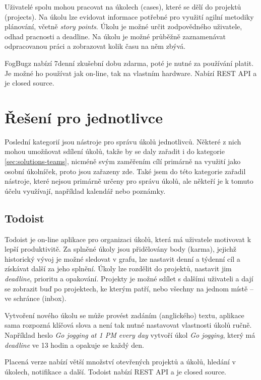 \documentclass[thesis=B,czech]{FITthesis}[2012/06/26]
\begin{document}
			Uživatelé spolu mohou pracovat na úkolech (cases), které se dělí do projektů (projects). Na úkolu lze evidovat informace potřebné pro využití agilní metodiky plánování, včetně \textit{story points}. Úkolu je možné určit zodpovědného uživatele, odhad pracnosti a deadline. Na úkolu je možné průběžně zaznamenávat odpracovanou práci a zobrazovat kolik času na něm zbývá.
			
			FogBugz nabízí 7denní zkušební dobu zdarma, poté je nutné za používání platit. Je možné ho používat jak on-line, tak na vlastním hardware. Nabízí REST API a je closed source.

	\section{Řešení pro jednotlivce}
		\label{sec:solutions-individuals}
		Poslední kategorií jsou nástroje pro správu úkolů jednotlivců. Některé z nich mohou umožňovat sdílení úkolů, takže by se daly zařadit i do kategorie \ref{sec:solutions-teams}, nicméně svým zaměřením cílí primárně na využití jako osobní úkolníček, proto jsou zařazeny zde. Také jsem do této kategorie zařadil nástroje, které nejsou primárně určeny pro správu úkolů, ale někteří je k tomuto účelu využívají, například kalendář nebo poznámky.
		
		\subsection{Todoist}
			Todoist \cite{todoist} je on-line aplikace pro organizaci úkolů, která má uživatele motivovat k lepší produktivitě. Za splněné úkoly jsou přidělovány body (karma), jejichž historický vývoj je možné sledovat v grafu, lze nastavit denní a týdenní cíl a získávat další  za jeho splnění. Úkoly lze rozdělit do projektů, nastavit jim \textit{deadline}, prioritu a opakování. Projekty je možné sdílet s dalšími uživateli a dají se zobrazit buď po projektech, ke kterým patří, nebo všechny na jednom místě -- ve schránce (inbox). 
			
			Vytvoření nového úkolu se může provést zadáním (anglického) textu, aplikace sama rozpozná klíčová slova a není tak nutné nastavovat vlastnosti úkolů ručně. Například heslo \textit{Go jogging at 1 PM every day} vytvoří úkol \textit{Go jogging}, který má \textit{deadline} ve 13 hodin a opakuje se každý den. 
			
			Placená verze nabízí větší množství otevřených projektů a úkolů, hledání v úkolech, notifikace a další.\cite{todoist-compare-premium} Todoist nabízí REST API\cite{todoist-api} a je closed source.
			
\end{document}
